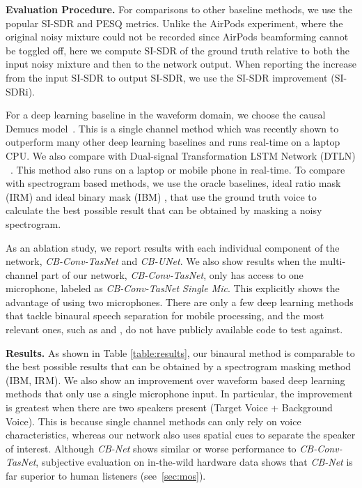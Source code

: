 \documentclass [11pt, proquest] {uwthesis}[2020/02/24]
\begin{document}
{\bf Evaluation Procedure.} For  comparisons to other baseline methods, we use the popular 
SI-SDR  and {PESQ} metrics.
Unlike the AirPods experiment, where the original noisy mixture could not be recorded since AirPods beamforming cannot be toggled off, here we compute SI-SDR of the ground truth relative to both the input noisy mixture and then to the network output. When reporting the increase from the input SI-SDR to output SI-SDR, we use the  SI-SDR improvement (SI-SDRi).

For a deep learning baseline in the waveform domain, we choose the causal Demucs model~\cite{demucsreal}. This is a single channel method which was recently shown to outperform many other deep learning baselines and runs real-time on a laptop CPU. We also compare with Dual-signal Transformation LSTM Network (DTLN) ~\cite{DTLN}. This method also runs on a laptop or mobile phone in real-time. To compare with spectrogram based methods, we use the oracle baselines, ideal ratio mask (IRM) and ideal binary mask (IBM) \cite{sigsep, wang2005ideal}, that use the ground truth voice to calculate the best possible result that can be obtained by masking a noisy spectrogram. 

As an ablation study, we report results with each individual component of the network,  \textit{CB-Conv-TasNet} and \textit{CB-UNet}. We also show results when the multi-channel part of our network, \textit{CB-Conv-TasNet}, only has access to one microphone, labeled as \textit{CB-Conv-TasNet Single Mic}. This explicitly shows the advantage of using two microphones.  There are only a few deep learning methods that tackle binaural speech separation for mobile processing, and the most relevant ones, such as \cite{binaural_osu} and \cite{han2020realtime}, do not have publicly available code to test against.



{\bf Results.} As shown in Table \ref{table:results}, our binaural method is comparable to the best possible results that can be obtained by a spectrogram masking method (IBM, IRM). We also show an improvement over waveform based deep learning methods that only use a single microphone input. In particular, the improvement is greatest when there are two speakers present (Target Voice + Background Voice). This is because single channel methods can only rely on voice characteristics, whereas our network also uses spatial cues to separate the speaker of interest. Although \textit{CB-Net} shows similar or worse performance to \textit{CB-Conv-TasNet}, subjective evaluation on in-the-wild hardware data shows that \textit{CB-Net} is far superior to human listeners (see~\ref{sec:mos}).
\end{document}
